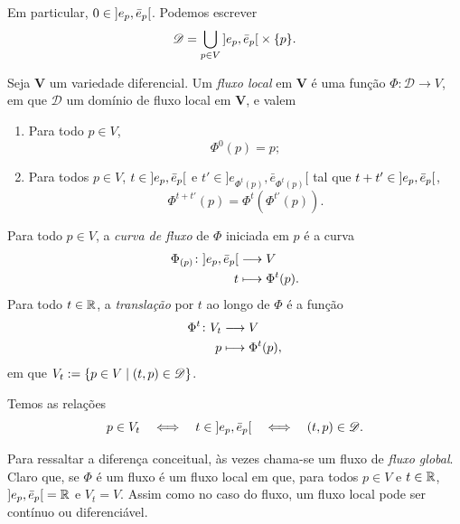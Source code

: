 Em particular, $0 \in \left]e_p,\allowbreak \bar e_p\right[$. Podemos escrever
	\begin{equation*}
	\mathscr{D} = \bigcup_{p \in V} \left]e_p,\allowbreak \bar e_p\right[ \times \{p\}.
	\end{equation*}

\begin{definition}
Seja $\bm V$ um variedade diferencial. Um \emph{fluxo local} em $\bm V$ é uma função $\Phi\colon \mathscr{D} \to V$, em que $\mathscr{D}$ um domínio de fluxo local em $\bm V$, e valem
	\begin{enumerate}
	\item Para todo $p \in V$,
		\begin{equation*}
		\Phi^0(p) = p;
		\end{equation*}
	\item Para todos $p \in V$, $t \in \left]e_p,\allowbreak \bar e_p\right[$ e $t' \in \left.] e_{\Phi^t(p)} , \bar e_{\Phi^t(p)} [\right.$ tal que $t+t' \in \left]e_p,\allowbreak \bar e_p\right[$,
		\begin{equation*}
		\Phi^{t+t'}(p) = \Phi^t(\Phi^{t'}(p)).
		\end{equation*}
	\end{enumerate}

Para todo $p \in V$, a \emph{curva de fluxo} de $\Phi$ iniciada em $p$ é a curva
	\begin{align*}
	{\Phi_{(p)}}\colon {\left]e_p,\allowbreak \bar e_p\right[} &\longrightarrow {V} \\{t} &\longmapsto \Phi^t(p).
	\end{align*}
Para todo $t \in \mathbb{R}$, a \emph{translação} por $t$ ao longo de $\Phi$ é a função
	\begin{align*}
	{\Phi^t}\colon {V_t} &\longrightarrow {V} \\{p} &\longmapsto \Phi^t(p),
	\end{align*}
em que $V_t := \left\{ p \in V \;\middle\vert\; (t,p) \in \mathscr{D} \right\}$.
\end{definition}

Temos as relações
	\begin{equation*}
	p \in V_t \quad \Longleftrightarrow \quad t \in \left]e_p,\allowbreak \bar e_p\right[ \quad \Longleftrightarrow \quad (t,p) \in \mathscr{D}.
	\end{equation*}

Para ressaltar a diferença conceitual, às vezes chama-se um fluxo de \textit{fluxo global}. Claro que, se $\Phi$ é um fluxo é um fluxo local em que, para todos $p \in V$ e $t \in \mathbb{R}$, $\left]e_p,\allowbreak \bar e_p\right[ = \mathbb{R}$ e $V_t=V$. Assim como no caso do fluxo, um fluxo local pode ser contínuo ou diferenciável.

